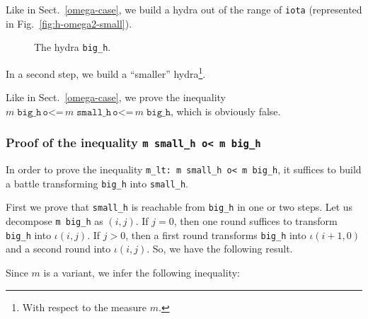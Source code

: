 Like in Sect.~\ref{omega-case}, we build a hydra out of the range of \texttt{iota} (represented in Fig.~\vref{fig:h-omega2-small}).

\begin{figure}[htb]
\centering
{}
\caption{\label{fig:h-omega2-small}}
 The hydra \texttt{big\_h}.
\end{figure}




 
 In a second step, we build a ``smaller'' hydra\footnote{With respect to the measure $m$.}.
 


\vspace{4pt}

Like in Sect.~\ref{omega-case}, we prove the inequality $m\;\texttt{big\_h} \,\texttt{o<=}\, m\;\texttt{small\_h} \,\texttt{o<=}\, m\;\texttt{big\_h}$, which is obviously false.

\subsubsection{Proof of the inequality \texttt{m small\_h o< m big\_h}}

In order to prove the inequality  \texttt{m\_lt: m small\_h o< m big\_h}, it suffices to
build a battle transforming \texttt{big\_h} into \texttt{small\_h}.

First we prove that \texttt{small\_h} is reachable from \texttt{big\_h} in one or two steps. Let us decompose \texttt{m big\_h} as $(i,j)$.
If $j=0$, then one round suffices to transform \texttt{big\_h} into $\iota(i,j)$.
If $j>0$, then a first round transforms \texttt{big\_h} into $\iota(i+1,0)$ and a second round into $\iota(i,j)$. So, we have the following result.



Since $m$ is a variant, we infer the following inequality:





